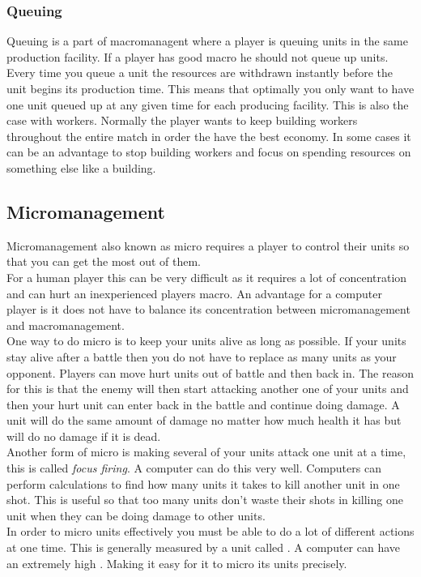 			\subsubsection{Queuing}
				Queuing is a part of macromanagent where a player is queuing units in the same production facility.	If a player has good macro he should not queue up units. 
				Every time you queue a unit the resources are withdrawn instantly before the unit begins its production time. This means that optimally you only want to have one unit
 				queued up at any given time for each producing facility. This is also the case with workers. Normally the player wants to keep building workers throughout the entire match
				in order the have the best economy. In some cases it can be an advantage to stop building workers and focus on spending resources on something else like a building.
				
				
	\subsection{Micromanagement}
		Micromanagement also known as micro requires a player to control their units so that you can get the most out of them.\\
		
		For a human player this can be very difficult as it requires a lot of concentration and can hurt an inexperienced players macro. 
		An advantage for a computer player is it does not have to balance its concentration between micromanagement and macromanagement.\\
		
		One way to do micro is to keep your units alive as long as possible. 
		If your units stay alive after a battle then you do not have to replace as many units as your opponent. 
		Players can move hurt units out of battle and then back in. 
		The reason for this is that the enemy will then start attacking another one of your 
		units and then your hurt unit can enter back in the battle and continue doing damage. 
		A unit will do the same amount of damage no matter how much health it has but will do no damage if it is dead.\\
		
		Another form of micro is making several of your units attack one unit at a time, this is called \textit{focus firing}.
		A computer can do this very well. Computers can perform calculations to find how many units it takes to kill another unit in one shot.
		This is useful so that too many units don't waste their shots in killing one unit when they can be doing damage to other units.\\
		In order to micro units effectively you must be able to do a lot of different actions at one time. 
		This is generally measured by a unit called \abapm. 
		A computer can have an extremely high \abapm. Making it easy for it to micro its units precisely.

